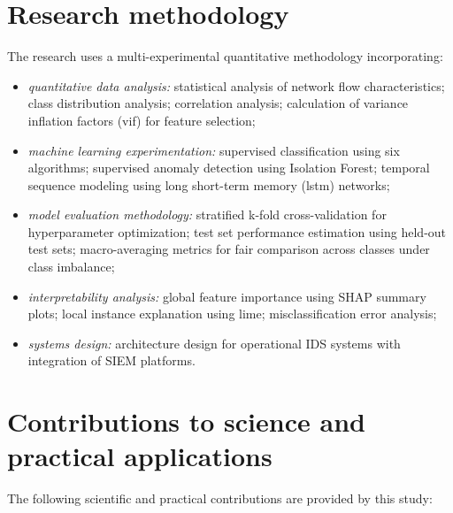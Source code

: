 \section{Research methodology}

The research uses a multi-experimental quantitative methodology incorporating:

\begin{itemize}
\item {\it quantitative data analysis:} statistical analysis of network flow characteristics; class distribution analysis; correlation analysis; calculation of variance inflation factors (vif) for feature selection;
\item {\it machine learning experimentation: }supervised classification using six algorithms; supervised anomaly detection using Isolation Forest; temporal sequence modeling using long short-term memory (lstm) networks;
\item {\it model evaluation methodology: }stratified k-fold cross-validation for hyperparameter optimization; test set performance estimation using held-out test sets; macro-averaging metrics for fair comparison across classes under class imbalance;
\item {\it interpretability analysis: }global feature importance using SHAP summary plots; local instance explanation using lime; misclassification error analysis;
\item {\it systems design: }architecture design for operational IDS systems with integration of SIEM platforms.
\end{itemize}

\section{Contributions to science and practical applications}

The following scientific and practical contributions are provided by this study:

